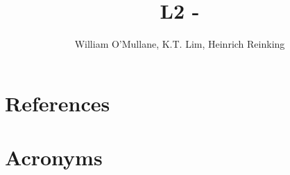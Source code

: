\documentclass[OPS,lsstdraft,authoryear,toc]{lsstdoc}
\title{L2 - \milestone}
\author{%
William O'Mullane, K.T. Lim, Heinrich Reinking
}
\date{\vcsDate}
\begin{document}
\maketitle



\appendix





\section{References} \label{sec:bib}
\renewcommand{\refname}{} %


\section{Acronyms} \label{sec:acronyms}

\end{document}
